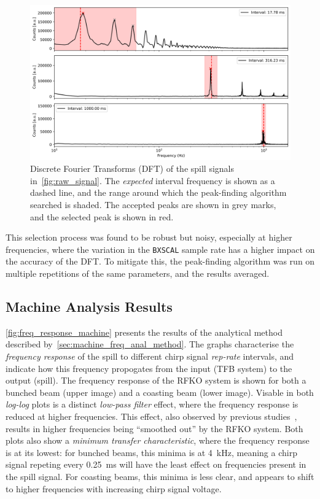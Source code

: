 \documentclass[11pt]{report}
\begin{document}
\begin{figure}
  \centering
  \includegraphics*[width=0.8\linewidth]{raw_ffts.png}
  \caption{Discrete Fourier Transforms (DFT) of the spill signals in~\autoref{fig:raw_signal}. The \textit{expected} interval frequency is shown as a dashed line, and the range around which the peak-finding algorithm searched is shaded. The accepted peaks are shown in grey marks, and the selected peak is shown in red.}\label{fig:raw_ffts}
\end{figure}

This selection process was found to be robust but noisy, especially at higher frequencies, where the variation in the \verb|BXSCAL| sample rate has a higher impact on the accuracy of the DFT. To mitigate this, the peak-finding algorithm was run on multiple repetitions of the same parameters, and the results averaged.


\subsection{Machine Analysis Results}
\autoref{fig:freq_response_machine} presents the results of the analytical method described by~\autoref{sec:machine_freq_anal_method}. The graphs characterise the \textit{frequency response} of the spill to different chirp signal \textit{rep-rate} intervals, and indicate how this frequency propogates from the input (TFB system) to the output (spill). The frequency response of the RFKO system is shown for both a bunched beam (upper image) and a coasting beam (lower image). Visable in both \textit{log-log} plots is a distinct \textit{low-pass filter} effect, where the frequency response is reduced at higher frequencies. This effect, also observed by previous studies~\cite{wepmp008,Pari:2780495}, results in higher frequencies being ``smoothed out'' by the RFKO system. Both plots also show a \textit{minimum transfer characteristic}, where the frequency response is at its lowest: for bunched beams, this minima is at \qty{4}{\kilo\hertz}, meaning a chirp signal repeting every \qty{0.25}{\milli\second} will have the least effect on frequencies present in the spill signal. For coasting beams, this minima is less clear, and appears to shift to higher frequencies with increasing chirp signal voltage.
\end{document}
